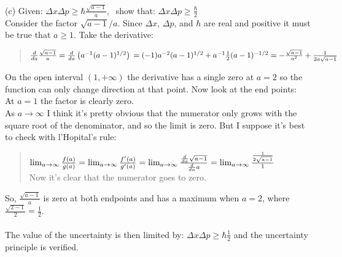 \documentclass{article}
\begin{document}
\pagebreak
(c) Given:
$
    \Delta x \Delta p \ge \hbar \frac{\sqrt{a-1}}{a},\;
$
show that:
$
    \Delta x \Delta p \ge \frac{\hbar}{2}
$
\vspace{12pt}\\
Consider the factor $\sqrt{a-1}/a$.
Since $\Delta x$, $\Delta p$, and $\hbar$ are real and positive
it must be true that $a\ge 1$. Take the derivative:
\begin{quote}
$
    \frac{d}{da}\frac{\sqrt{a-1}}{a}
    \vspace{12pt}\\
    = \frac{d}{da}\left( a^{-1} (a-1)^{1/2} \right)
    \vspace{12pt}\\
    = (-1)a^{-2}(a-1)^{1/2} + a^{-1} \frac{1}{2}(a-1)^{-1/2}
    \vspace{12pt}\\
    = -\frac{\sqrt{a-1}}{a^2} + \frac{1}{2a\sqrt{a-1}}
$
\end{quote}
On the open interval $(1,+\infty)$ the
derivative has a single zero at $a=2$ so the function can only
change direction at that point. Now look at the end points:
\vspace{6pt}\\
At $a=1$ the factor is clearly zero.
\vspace{6pt}\\
As $a\rightarrow\infty$ I think it's pretty obvious that the numerator
only grows with the square root of the denominator, and so the limit
is zero. But I suppose it's best to check with l'Hopital's rule:
\begin{quote}
$
    \lim_{a\to \infty}\frac{f(a)}{g(a)} =
    \lim_{a\to \infty}\frac{f'(a)}{g'(a)}
    \vspace{12pt}\\
    = \lim_{a\to \infty} \frac{\frac{d}{da}\sqrt{a-1}} {\frac{d}{da} a}
    \vspace{12pt}\\
    = \lim_{a\to \infty}\frac{\frac{1}{2\sqrt{a-1}}}{1}
$
    \vspace{12pt}\\
    Now it's clear that the numerator goes to zero.
\end{quote}
\vspace{6pt}
So, $\frac{\sqrt{a-1}}{a}$ is zero at both endpoints and has a maximum
when $a=2$, where $\frac{\sqrt{2-1}}{2}=\frac{1}{2}$.
\\\\
The value of the uncertainty is then limited by:
$
    \Delta x \Delta p \ge \hbar\frac{1}{2}
$
and the uncertainty principle is verified.
\end{document}
